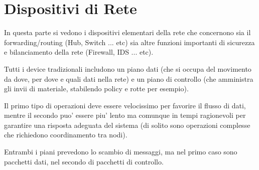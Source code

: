 \chapter{Dispositivi di Rete}

In questa parte si vedono i dispositivi elementari della rete che concernono sia il forwarding/routing (Hub, Switch ... etc) sia altre funzioni importanti di sicurezza e bilanciamento della rete (Firewall, IDS ... etc).


Tutti i device tradizionali includono un piano dati (che si occupa del movimento da dove, per dove e quali dati nella rete) e un piano di controllo (che amministra gli invii di materiale, stabilendo policy e rotte per esempio).

Il primo tipo di operazioni deve essere velocissimo per favorire il flusso di dati, mentre il secondo puo' essere piu' lento ma comunque in tempi ragionevoli per garantire una risposta adeguata del sistema (di solito sono operazioni complesse che richiedono coordinamento tra nodi).

Entrambi i piani prevedono lo scambio di messaggi, ma nel primo caso sono pacchetti dati, nel secondo di pacchetti di controllo.
